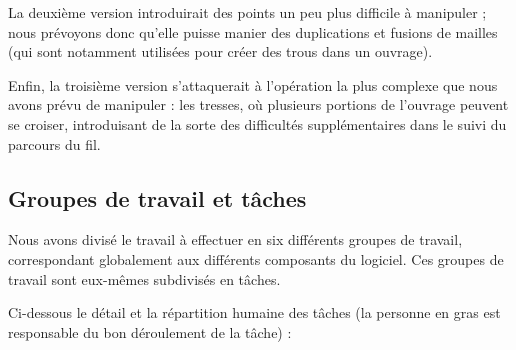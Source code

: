 \documentclass{article}
\begin{document}
La deuxième version introduirait des points un peu plus difficile à manipuler ; nous prévoyons donc qu'elle puisse manier des duplications et
fusions de mailles (qui sont notamment utilisées pour créer des trous dans un ouvrage).

Enfin, la troisième version s'attaquerait à l'opération la plus complexe que nous avons prévu de manipuler : les tresses, où plusieurs portions
de l'ouvrage peuvent se croiser, introduisant de la sorte des difficultés supplémentaires dans le suivi du parcours du fil.

\subsection{Groupes de travail et tâches\label{workpackages}}

Nous avons divisé le travail à effectuer en six différents groupes de travail, correspondant globalement aux différents composants du
logiciel. Ces groupes de travail sont eux-mêmes subdivisés en tâches.

Ci-dessous le détail et la répartition humaine des tâches (la personne en gras est responsable du bon déroulement de la tâche) : \newline
\end{document}
